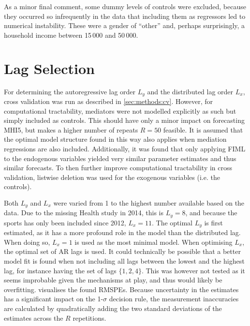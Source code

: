 As a minor final comment, some dummy levels of controls were excluded, because they occurred so infrequently in the data
that including them as regressors led to numerical instability.
These were a gender of ``other'' and, perhaps surprisingly, a household income between 15\,000 and 50\,000.

\section{Lag Selection}
\label{sec:modelling:lags}
For determining the autoregressive lag order $L_y$ and the distributed lag order $L_x$, cross validation was run as
described in \cref{sec:methods:cv}.
However, for computational tractability, mediators were not modelled explicitly as such but simply included as controls.
This should have only a minor impact on forecasting MHI5, but makes a higher number of repeats $R = 50$ feasible.
It is assumed that the optimal model structure found in this way also applies when mediation regressions are also
included.
Additionally, it was found that only applying FIML to the endogenous variables yielded very similar parameter estimates
and thus similar forecasts. To then further improve computational tractability in cross validation, listwise deletion
was used for the exogenous variables (i.e. the controls).

Both $L_y$ and $L_x$ were varied from 1 to the highest number available based on the data.
Due to the missing Health study in 2014, this is $L_y = 8$, and because the sports has only been included since 2012,
$L_x = 11$.
The optimal $L_y$ is first estimated, as it has a more profound role in the model than the distributed lag.
When doing so, $L_x = 1$ is used as the most minimal model. When optimising $L_x$, the optimal set of AR lags is used.
It could technically be possible that a better model fit is found when not including all lags between the lowest
and the highest lag, for instance having the set of lags $\{1, 2, 4\}$. This was however not tested as it seems improbable
given the mechanisms at play, and thus would likely be overfitting.
 visualises the found RMSPEs. Because uncertainty in the estimates has a significant impact
on the 1-$\sigma$ decision rule, the measurement inaccuracies are calculated by quadratically adding the two standard
deviations of the estimates across the $R$ repetitions.

